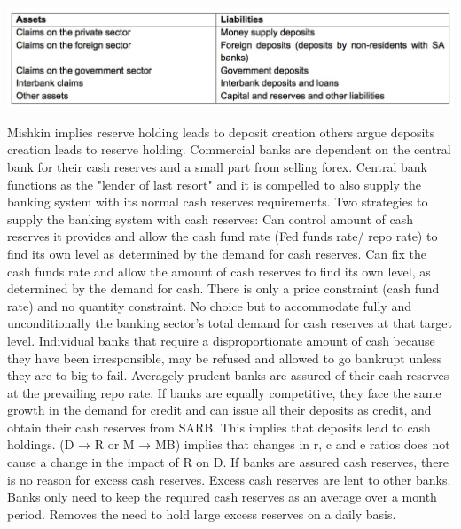 \documentclass[12pt]{examnotes}
\begin{document}
\vspace{6pt}
\includegraphics[scale=0.5]{./imgs/153.jpg}

\ra Mishkin implies reserve holding leads to deposit creation others argue deposits creation leads to reserve holding.
\ra Commercial banks are dependent on the central bank for their cash reserves and a small part from selling forex.
\ra Central bank functions as the "lender of last resort" and it is compelled to also supply the banking system with its normal cash reserves requirements.
\ra Two strategies to supply the banking system with cash reserves:
 Can control amount of cash reserves it provides and allow the cash fund rate (Fed funds rate/ repo rate) to find its own level as determined by the demand for cash reserves.
 Can fix the cash funds rate and allow the amount of cash reserves to find its own level, as determined by the demand for cash.
\rna There is only a price constraint (cash fund rate) and no quantity constraint.
\rna No choice but to accommodate fully and unconditionally the banking sector's total demand for cash reserves at that target level.
\rna Individual banks that require a disproportionate amount of cash because they have been  irresponsible, may be refused and allowed to go bankrupt unless they are to big to fail.
\rna Averagely prudent banks are assured of their cash reserves at the prevailing repo rate. 
\rna If banks are equally competitive, they face the same growth in the demand for credit and can issue all their deposits as credit, and obtain their cash reserves from SARB. This implies that deposits lead to cash holdings.
\rna (D → R or M → MB) implies that changes in r, c and e ratios does not cause a change in the impact of R on D.
\rna If banks are assured cash reserves, there is no reason for excess cash reserves. Excess cash reserves are lent to other banks.
\rna Banks only need to keep the required cash reserves as an average over a month period. Removes the need to hold large excess reserves on a daily basis.
\end{document}
